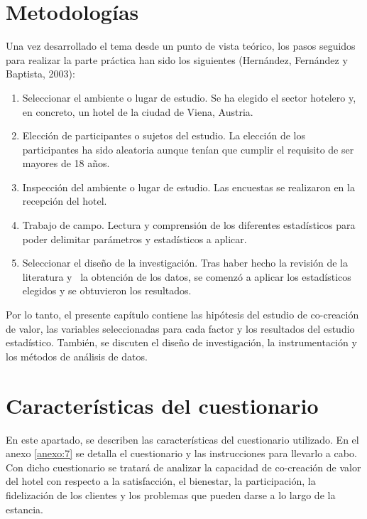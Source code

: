 \section{Metodologías}

Una vez desarrollado el tema desde un punto de vista teórico, los pasos seguidos para realizar la parte práctica han sido los siguientes (Hernández, Fernández y Baptista, 2003):

\begin{enumerate} 
	\item Seleccionar el ambiente o lugar de estudio. Se ha elegido el sector hotelero y, en concreto, un hotel de la ciudad de Viena, Austria. 
	\item Elección de participantes o sujetos del estudio. La elección de los participantes ha sido aleatoria aunque tenían que cumplir el requisito de ser mayores de 18 años. 
	\item Inspección del ambiente o lugar de estudio. Las encuestas se realizaron en la recepción del hotel. 
	\item Trabajo de campo. Lectura y comprensión de los diferentes estadísticos para poder delimitar parámetros y estadísticos a aplicar. 
	\item Seleccionar el diseño de la investigación. Tras haber hecho la revisión de la literatura y  la obtención de los datos, se comenzó a aplicar los estadísticos elegidos y se obtuvieron los resultados. 

\end{enumerate}

Por lo tanto, el presente capítulo contiene las hipótesis del estudio de co-creación de valor, las variables seleccionadas para cada factor y los resultados del estudio estadístico. También, se discuten el diseño de investigación, la instrumentación y los métodos de análisis de datos.

\section{Características del cuestionario}

En este apartado, se describen las características del cuestionario utilizado. En el anexo \ref{anexo:7} se detalla el cuestionario y las instrucciones para llevarlo a cabo. Con dicho cuestionario se tratará de analizar la capacidad de co-creación de valor del hotel con respecto a la satisfacción, el bienestar, la participación, la fidelización de los clientes y los problemas que pueden darse a lo largo de la estancia. 

